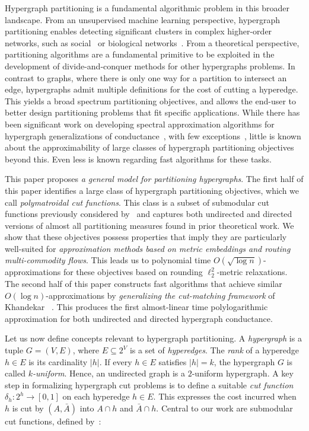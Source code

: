 \documentclass[letterpaper]{article}
\begin{document}
Hypergraph partitioning is a fundamental algorithmic problem in this broader landscape. From an unsupervised machine learning perspective, hypergraph partitioning enables detecting significant clusters in complex higher-order networks, such as social~\cite{tsourakakis2017scalable,yang2017hypergraph} or biological networks~\cite{feng2021hypergraph, klamt2009hypergraphs}. From a theoretical perspective, partitioning algorithms are a fundamental primitive to be exploited in the development of divide-and-conquer methods for other hypergraphs problems. In contrast to graphs, where there is only one way for a partition to intersect an edge, hypergraphs admit multiple definitions for the cost of cutting a hyperedge. This yields a broad spectrum partitioning objectives, and allows the end-user to better design partitioning problems that fit specific applications. While there has been significant work on developing spectral approximation algorithms for hypergraph generalizations of conductance~\cite{chan2018spectral,lau2022cheeger,kwok2022cheeger}, with few exceptions~\cite{louis2016approximation}, little is known about the approximability of large classes of hypergraph partitioning objectives beyond this. Even less is known regarding fast algorithms for these tasks.

This paper proposes \emph{a general model for partitioning hypergraphs}. The first half of this paper identifies a large class of hypergraph partitioning objectives, which we call \emph{polymatroidal cut functions}. This class is a subset of submodular cut functions previously considered by~\cite{li2017inhomogeneous, liSubmodularHypergraphsPLaplacians2018} and captures both undirected and directed versions of almost all partitioning measures found in prior theoretical work. We show that these objectives possess properties that imply they are particularly well-suited for \emph{approximation methods based on metric embeddings and routing multi-commodity flows}. This leads us to polynomial time $O(\sqrt{\log n})$-approximations for these objectives based on rounding $\ell_2^2$-metric relaxations. The second half of this paper constructs fast algorithms that achieve similar $O(\log n)$-approximations by \emph{generalizing the cut-matching framework} of Khandekar \etal~\cite{khandekar2007cut}. This produces the first almost-linear time polylogarithmic approximation for both undirected and directed hypergraph conductance.


Let us now define concepts relevant to hypergraph partitioning. A \emph{hypergraph} is a tuple $G = (V, E)$, where $E \subseteq 2^V$ is a set of \emph{hyperedges}. The \emph{rank} of a hyperedge $h \in E$ is its cardinality $\lvert h \rvert$. If every $h \in E$ satisfies $\lvert h \rvert = k$, the hypergraph $G$ is called \emph{$k$-uniform}. Hence, an undirected graph is a $2$-uniform hypergraph. A key step in formalizing hypergraph cut problems is to define a suitable \emph{cut function} $\delta_h: 2^h \to [0,1]$ on each hyperedge $h \in E$. This expresses the cost incurred when $h$ is cut by $(A, \bar{A})$ into $A \cap h$ and $\bar{A} \cap h$. Central to our work are submodular cut functions, defined by~\cite{li2017inhomogeneous, liSubmodularHypergraphsPLaplacians2018}:
\end{document}

